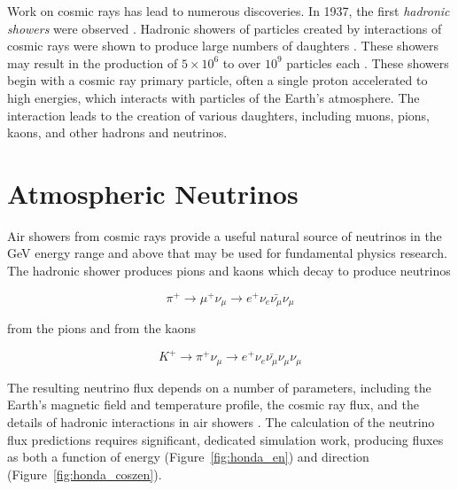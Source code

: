 Work on cosmic rays has lead to numerous discoveries.
In 1937, the first \emph{hadronic showers} were observed \cite{Blau-HadronicShowers}. 
Hadronic showers of particles created by interactions of cosmic rays were shown to produce large numbers of daughters \cite{Kolhoerster-CoincidenceDetectors, Hoerandel-CRHistory}.
These showers may result in the production of  $5\times10^6$ to over $10^9$ particles each \cite{CosmicRays-Extent}.
These showers begin with a cosmic ray primary particle, often a single proton accelerated to high energies, which interacts with particles of the Earth's atmosphere.
The interaction leads to the creation of various daughters, including muons, pions, kaons, and other hadrons and neutrinos.


\section{Atmospheric Neutrinos}
\label{sec:atmo_nus}
Air showers from cosmic rays provide a useful natural source of neutrinos in the GeV energy range and above that may be used for fundamental physics research.
The hadronic shower produces pions and kaons which decay to produce neutrinos 

\begin{equation}
\pi^+ \rightarrow \mu^+ \nu_\mu \rightarrow e^+ \nu_e \bar{\nu_\mu} \nu_\mu
\end{equation}

from the pions and from the kaons

\begin{equation}
K^+ \rightarrow \pi^+ \nu_\mu \rightarrow  e^+ \nu_e \bar{\nu_\mu} \nu_\mu \nu_\mu
\end{equation}

The resulting neutrino flux depends on a number of parameters, including the Earth's magnetic field and temperature profile, the cosmic ray flux, and the details of hadronic interactions in air showers \cite{Honda-2015}.
The calculation of the neutrino flux predictions requires significant, dedicated simulation work, producing fluxes as both a function of energy (Figure~\ref{fig:honda_en}) and direction (Figure~\ref{fig:honda_coszen}).

